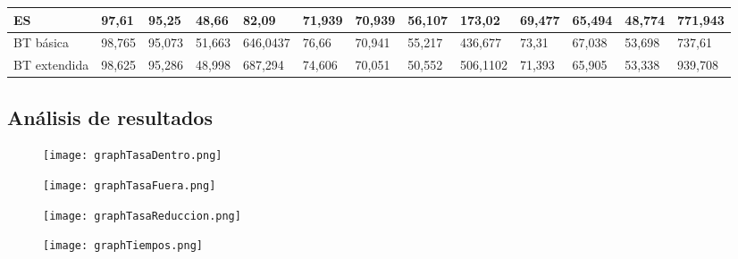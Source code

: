 \documentclass[10pt,a4paper]{article}
\begin{document}
\begin{table}[H]
{\begin{tabular}{lllllllllllll}
\multicolumn{1}{|l|}{ES}                       & \multicolumn{1}{l|}{97,61}         & \multicolumn{1}{l|}{95,25}   & \multicolumn{1}{l|}{48,66}  & \multicolumn{1}{l|}{82,09}        & \multicolumn{1}{l|}{71,939}        & \multicolumn{1}{l|}{70,939}  & \multicolumn{1}{l|}{56,107} & \multicolumn{1}{l|}{173,02}       & \multicolumn{1}{l|}{69,477}        & \multicolumn{1}{l|}{65,494}  & \multicolumn{1}{l|}{48,774} & \multicolumn{1}{l|}{771,943} \\ \hline
\multicolumn{1}{|l|}{BT básica}                & \multicolumn{1}{l|}{98,765}        & \multicolumn{1}{l|}{95,073}  & \multicolumn{1}{l|}{51,663} & \multicolumn{1}{l|}{646,0437}     & \multicolumn{1}{l|}{76,66}         & \multicolumn{1}{l|}{70,941}  & \multicolumn{1}{l|}{55,217} & \multicolumn{1}{l|}{436,677}      & \multicolumn{1}{l|}{73,31}         & \multicolumn{1}{l|}{67,038}  & \multicolumn{1}{l|}{53,698} & \multicolumn{1}{l|}{737,61}  \\ \hline
\multicolumn{1}{|l|}{BT extendida}             & \multicolumn{1}{l|}{98,625}        & \multicolumn{1}{l|}{95,286}  & \multicolumn{1}{l|}{48,998} & \multicolumn{1}{l|}{687,294}      & \multicolumn{1}{l|}{74,606}        & \multicolumn{1}{l|}{70,051}  & \multicolumn{1}{l|}{50,552} & \multicolumn{1}{l|}{506,1102}     & \multicolumn{1}{l|}{71,393}        & \multicolumn{1}{l|}{65,905}  & \multicolumn{1}{l|}{53,338} & \multicolumn{1}{l|}{939,708} \\ \hline
\end{tabular}}
\end{table}

\subsection{\color[rgb]{0.0,0.0,0.51}Análisis de resultados}

\begin{figure}[H]
\centering
\texttt{[image: graphTasaDentro.png]}
\end{figure}


\begin{figure}[H]
\centering
\texttt{[image: graphTasaFuera.png]}
\end{figure}


\begin{figure}[H]
\centering
\texttt{[image: graphTasaReduccion.png]}
\end{figure}


\begin{figure}[H]
\centering
\texttt{[image: graphTiempos.png]}
\end{figure}
\end{document}

